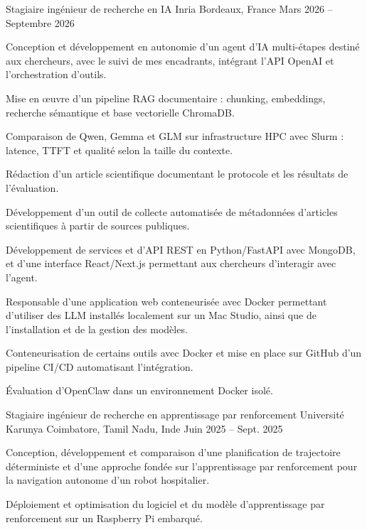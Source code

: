 
\begin{cventries}
  \cventry
    {Stagiaire ingénieur de recherche en IA}
    {Inria}
    {Bordeaux, France}
    {Mars 2026 -- Septembre 2026}
    {
      \begin{cvitems}
        \item {Conception et développement en autonomie d’un agent d’IA multi-étapes destiné aux chercheurs, avec le suivi de mes encadrants, intégrant l’API OpenAI et l’orchestration d’outils.}
        \item {Mise en œuvre d’un pipeline RAG documentaire : chunking, embeddings, recherche sémantique et base vectorielle ChromaDB.}
        \item {Comparaison de Qwen, Gemma et GLM sur infrastructure HPC avec Slurm : latence, TTFT et qualité selon la taille du contexte.}
        \item {Rédaction d’un article scientifique documentant le protocole et les résultats de l’évaluation.}
        \item {Développement d’un outil de collecte automatisée de métadonnées d’articles scientifiques à partir de sources publiques.}
        \item {Développement de services et d’API REST en Python/FastAPI avec MongoDB, et d’une interface React/Next.js permettant aux chercheurs d’interagir avec l’agent.}
        \item {Responsable d’une application web conteneurisée avec Docker permettant d’utiliser des LLM installés localement sur un Mac Studio, ainsi que de l’installation et de la gestion des modèles.}
        \item {Conteneurisation de certains outils avec Docker et mise en place sur GitHub d’un pipeline CI/CD automatisant l’intégration.}
        \item {Évaluation d’OpenClaw dans un environnement Docker isolé.}
      \end{cvitems}
    }

  \cventry
    {Stagiaire ingénieur de recherche en apprentissage par renforcement}
    {Université Karunya}
    {Coimbatore, Tamil Nadu, Inde}
    {Juin 2025 -- Sept. 2025}
    {
      \begin{cvitems}
        \item {Conception, développement et comparaison d’une planification de trajectoire déterministe et d’une approche fondée sur l’apprentissage par renforcement pour la navigation autonome d’un robot hospitalier.}
        \item {Déploiement et optimisation du logiciel et du modèle d’apprentissage par renforcement sur un Raspberry Pi embarqué.}
      \end{cvitems}
    }
\end{cventries}
